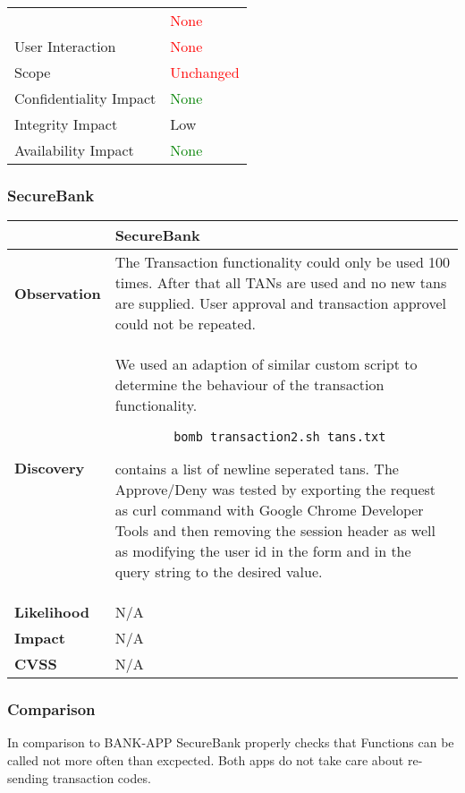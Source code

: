 \begin{tabular*}{\textwidth}{ p{} | p{} }
\begin{tabular}{l | l}
            Privileges Required     & \textcolor{red}{None} \\
            User Interaction        & \textcolor{red}{None} \\
            Scope                   & \textcolor{red}{Unchanged} \\
            Confidentiality Impact  & \textcolor{Green}{None} \\
            Integrity Impact        & \textcolor{BurntOrange}{Low} \\
            Availability Impact     & \textcolor{Green}{None}
        \end{tabular}
    \\ \hline
\end{tabular*}

\subsubsection{SecureBank}
\begin{tabular*}{\textwidth}{ p{} | p{} }\hline
    & \textbf{SecureBank} \\ \hline
    \textbf{Observation} & 
    The Transaction functionality could only be used 100 times. After that all TANs are used and no new tans are supplied.
    User approval and transaction approvel could not be repeated.
    \\
    \textbf{Discovery} & 
    	We used an adaption of similar custom script to determine the behaviour of the transaction functionality.
    	\begin{lstlisting}
    	bomb_transaction2.sh tans.txt
    	\end{lstlisting}
    	\code{tans.txt} contains a list of newline seperated tans.\newline
    	The Approve/Deny was tested by exporting the request as curl command with Google Chrome Developer Tools and then removing the session header as well as modifying the user id in the form and in the query string to the desired value.
    \\
    \textbf{Likelihood} &
    	N/A
    \\
    \textbf{Impact} & 
    	N/A
    \\
    \textbf{CVSS} &
    	N/A
    \\ \hline
\end{tabular*}

\subsubsection{Comparison}
In comparison to BANK-APP SecureBank properly checks that Functions can be called not more often than excpected.
Both apps do not take care about re-sending transaction codes.
\clearpage
\clearpage
